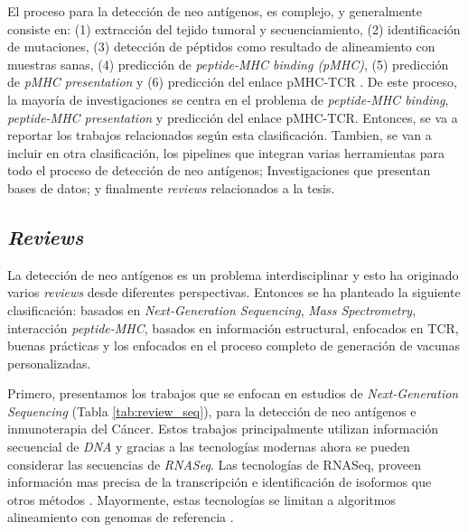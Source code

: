  El proceso para la detección de neo antígenos, es complejo, y generalmente consiste en: (1) extracción del tejido tumoral y secuenciamiento, (2) identificación de mutaciones, (3) detección de péptidos como resultado de alineamiento con muestras sanas, (4) predicción de \textit{peptide-MHC binding (pMHC)}, (5) predicción de \textit{pMHC presentation} y (6) predicción del enlace pMHC-TCR \citep{de2020neoantigen, peng2019neoantigen}. De este proceso, la mayoría de investigaciones se centra en el problema de \textit{peptide-MHC binding}, \textit{peptide-MHC presentation} y predicción del enlace pMHC-TCR. Entonces, se va a reportar los trabajos relacionados según esta clasificación. Tambien, se van a incluir en otra clasificación, los pipelines que integran varias herramientas para todo el proceso de detección de neo antígenos; Investigaciones que presentan bases de datos; y finalmente \textit{reviews} relacionados a la tesis.


\subsection{\textit{Reviews}}

La detección de neo antígenos es un problema interdisciplinar y esto ha originado  varios \textit{reviews} desde diferentes perspectivas. Entonces se ha planteado la siguiente clasificación: basados en \textit{Next-Generation Sequencing}, \textit{Mass Spectrometry}, interacción \textit{peptide-MHC}, basados en información estructural, enfocados en TCR, buenas prácticas y los enfocados en el proceso completo de generación de vacunas personalizadas.

Primero, presentamos los trabajos que se enfocan en estudios de \textit{Next-Generation Sequencing} (Tabla \ref{tab:review_seq}), para la detección de neo antígenos e inmunoterapia del Cáncer. Estos trabajos principalmente utilizan información secuencial de \textit{DNA} y gracias a las tecnologías modernas ahora se pueden considerar las secuencias de \textit{RNASeq}. Las tecnologías de RNASeq, proveen información mas precisa de la transcripción e identificación de isoformos que otros métodos \citep{wang2009rna}. Mayormente, estas tecnologías se limitan a algoritmos alineamiento con genomas de referencia \citep{groisberg2018immunotherapy}. 






